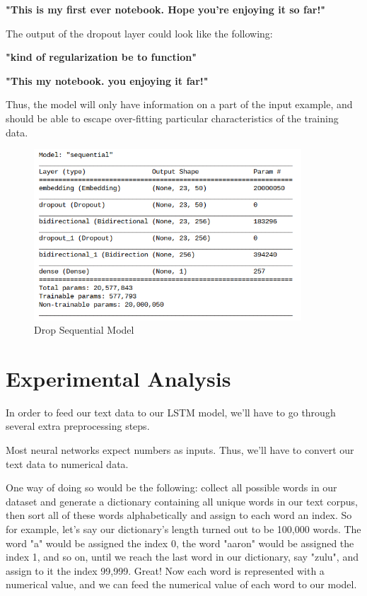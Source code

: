 \documentclass{article}
\begin{document}
\textbf{"This is my first ever notebook. Hope you're enjoying it so far!"}

The output of the dropout layer could look like the following:

\textbf{"kind of regularization be to function"}

\textbf{"This my notebook. you enjoying it far!"}

Thus, the model will only have information on a part of the input example, and should be able to escape over-fitting particular characteristics of the training data.

\begin{figure}[h!]
    \centering
    \includegraphics[width=10cm]{drop_seq.png}
    \caption{Drop Sequential Model}
    \label{fig:dsq_model}
\end{figure}

\newpage
\section{Experimental Analysis}
In order to feed our text data to our LSTM model, we'll have to go through several extra preprocessing steps.

Most neural networks expect numbers as inputs. Thus, we'll have to convert our text data to numerical data.

One way of doing so would be the following: collect all possible words in our dataset and generate a dictionary containing all unique words in our text corpus, then sort all of these words alphabetically and assign to each word an index. So for example, let's say our dictionary's length turned out to be 100,000 words. The word "a" would be assigned the index 0, the word "aaron" would be assigned the index 1, and so on, until we reach the last word in our dictionary, say "zulu", and assign to it the index 99,999. Great! Now each word is represented with a numerical value, and we can feed the numerical value of each word to our model.
\end{document}
